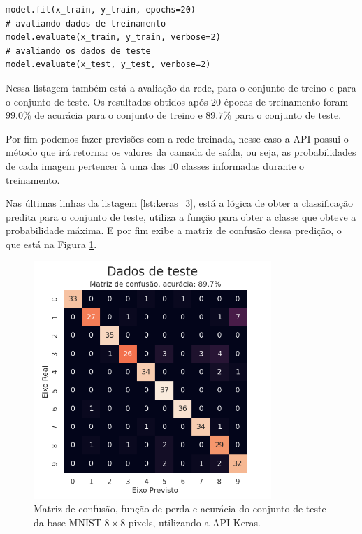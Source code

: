 \begin{scriptsize}
\estiloR
\begin{lstlisting}[caption={Trecho do script \eng{mnist\_keras.py}},label={lst:keras_3},escapeinside={\%}]
model.fit(x_train, y_train, epochs=20)
# avaliando dados de treinamento
model.evaluate(x_train, y_train, verbose=2)
# avaliando os dados de teste
model.evaluate(x_test, y_test, verbose=2)
\end{lstlisting}
\end{scriptsize}

Nessa listagem também está a avaliação da rede, para o conjunto de treino e para o conjunto de teste. Os resultados obtidos após $20$ épocas de treinamento foram $99.0\%$ de acurácia para o conjunto de treino e $89.7\%$ para o conjunto de teste. 

Por fim podemos fazer previsões com a rede treinada, nesse caso a API possui o método  que irá retornar os valores da camada de saída, ou seja, as probabilidades de cada imagem pertencer à uma das $10$ classes informadas durante o treinamento.

Nas últimas linhas da listagem \ref{lst:keras_3}, está a lógica de obter a classificação predita para o conjunto de teste, utiliza a função  para obter a classe que obteve a probabilidade máxima. E por fim exibe a matriz de confusão dessa predição, o que está na Figura \ref{fig:keras_test}.

\begin{figure}[htb]
\centering
\includegraphics[width=9cm]{figuras/keras_test}
\caption{Matriz de confusão, função de perda e acurácia do conjunto de teste da base MNIST ${8\times8}$ pixels, utilizando a API Keras.}
\label{fig:keras_test}
\end{figure}


